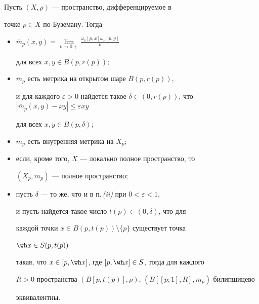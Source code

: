 \begin{thm}


Пусть $(X,\rho)$ --- пространство, дифференцируемое в


точке $p \in X$ по Буземану. Тогда


\begin{itemize}


\item[(i)]


$\overline{m}_{p}(x, y)=\lim \limits_{\nu \to 0+}


{\frac{\omega_{\nu}[p, x]\omega_{\nu}[p,y]}{\nu}}$


для всех $x, y\in B(p,r(p));$


\item[(ii)] $\overline{m}_{p}$ есть метрика на открытом шаре $B(p, r(p))$,


и для каждого $\varepsilon>0$ найдется такое $\delta \in (0,


r(p))$, что $|\overline{m}_{p}(x, y) - xy| \leq \varepsilon xy$


для всех $x, y \in B(p,\delta);$


\item[(iii)] $m_{p}$ есть внутренняя метрика на $X_{p};$


\item[(iv)] если, кроме того, $X$ --- локально полное пространство, то


$(X_{p},m_{p})$ --- полное пространство\/$;$


\item[(v)] пусть $\delta$ --- то же, что и в п.\,{\em (ii)} при $0<\varepsilon<1$,


и пусть найдется такое число $t(p) \in (0,\delta)$, что для


каждой точки $x \in B(p,t(p))\setminus\{p\}$ существует точка


$\wh x \in S(p,t(p))$


такая, что $x \in [p,\wh x]$, где $[p,\wh x] \in S$, тогда для каждого


$R>0$ пространства $(B[p,t(p)],\rho)$, $(B[[p;1],R],m_p)$ билипшицево


эквивалентны.


\end{itemize}


\end{thm}








